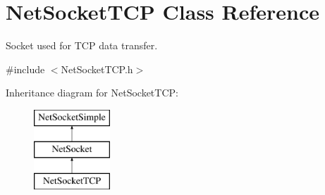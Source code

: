 \hypertarget{class_net_socket_t_c_p}{
\section{NetSocketTCP Class Reference}
\label{class_net_socket_t_c_p}
}


Socket used for TCP data transfer.  




{\ttfamily \#include $<$NetSocketTCP.h$>$}

Inheritance diagram for NetSocketTCP:\begin{figure}[H]
\begin{center}
\leavevmode
\includegraphics[height=3.000000cm]{class_net_socket_t_c_p}
\end{center}
\end{figure}
